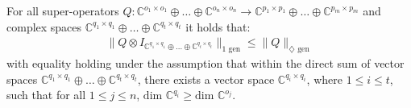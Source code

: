   \begin{theorem} \label{theorem:tensor_stability} 
For all super-operators $Q: \mathbb{C}^{o_1 \times o_1} \oplus \ldots \oplus \mathbb{C}^{o_n \times o_n}  \rightarrow \mathbb{C}^{p_1 \times p_1} \oplus \ldots \oplus  \mathbb{C}^{p_m \times p_m}$ and complex spaces $\mathbb{C}^{q_1 \times q_1} \oplus \ldots \oplus \mathbb{C}^{q_t \times q_t}$  it holds that:
    \begin{equation}
      \begin{split}
        \lVert Q \otimes I_{\mathbb{C}^{q_1 \times q_1} \oplus \ldots \oplus \mathbb{C}^{q_t \times q_t}} \rVert_{1 \text{ gen}} \leq  \lVert Q \rVert_{\diamondsuit \text{ gen}}
      \end{split}
    \end{equation}
  with equality holding under the assumption that within the direct sum of vector spaces $\mathbb{C}^{q_1 \times q_1} \oplus \ldots \oplus \mathbb{C}^{q_t \times q_t}$, there  exists a vector space $\mathbb{C}^{q_i \times q_i}$, where $1 \leq i \leq t$, such that for all $1 \leq j \leq n$, $\text{dim }\mathbb{C}^{q_i} \geq  \text{dim }\mathbb{C}^{o_j}$.
  
    \end{theorem}

